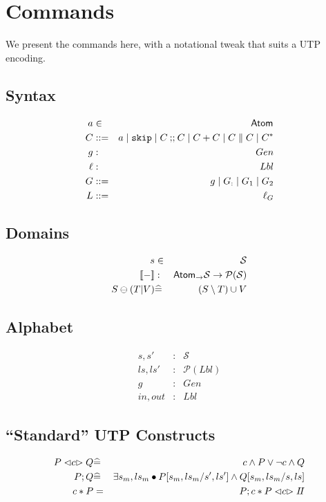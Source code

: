 \section{Commands}


We present the commands here,
with a notational tweak that suits a UTP encoding.

\subsection{Syntax}

\begin{eqnarray*}
   a &\in& \mathsf{Atom_{}}
\\ C &::=& a \mid \texttt{skip} \mid C \mathbin{;\!;} C \mid C+C \mid C \parallel C \mid C^*
\\ g &:& Gen
\\ \ell &:& Lbl
\\ G &::=&  g \mid G_{:} \mid G_1 \mid G_2
\\ L &::=& \ell_G
\end{eqnarray*}

\subsection{Domains}
\begin{eqnarray*}
   s &\in& \mathcal S
\\ \sem{-} &:& \Atom \fun \mathcal S \fun \mathcal P(\mathcal S)
\\ S \ominus (T|V)
   &\defs& (S \setminus T) \cup V
\end{eqnarray*}

\subsection{Alphabet}

\begin{eqnarray*}
   s, s' &:& \mathcal S
\\ ls, ls' &:& \mathcal P (Lbl)
\\ g &:& Gen
\\ in, out &:& Lbl
\end{eqnarray*}

\subsection{``Standard'' UTP Constructs}

\begin{eqnarray*}
   P \mathrel{\lhd{c}\rhd} Q
   &\widehat=&
   c \land P \lor \lnot c \land Q
\\ P ; Q
   &\widehat=&
   \exists s_m,ls_m \bullet P[s_m,ls_m/s',ls'] \land Q[s_m,ls_m/s,ls]
\\ c * P
   &=&
   P ; c * P \mathrel{\lhd{c}\rhd} I\!I
\end{eqnarray*}

